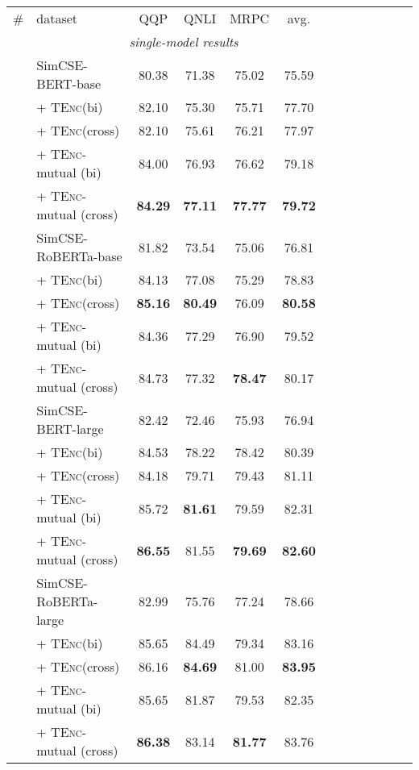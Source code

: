 \documentclass{article} \usepackage{iclr2021_conference,times}
\newcommand{\tenc}{\textsc{TEnc}\xspace}
\begin{document}
\begin{table}[!t] \setlength{\tabcolsep}{3.6pt}
\centering
\begin{tabular}{llccccccccccc}
\cmidrule[1.5pt]{1-10}
\# & dataset  & QQP & QNLI & MRPC & avg.\\
\cmidrule[1.5pt]{1-10}
\multicolumn{9}{c}{\textit{single-model results}} \\
\cmidrule[1.0pt]{1-10}
 & SimCSE-BERT-base & 80.38 & 71.38 & 75.02 & 75.59 \\
 & + \tenc (bi) & 82.10 & 75.30 & 75.71 & 77.70 \\
  & + \tenc (cross) & 82.10 & 75.61  & 76.21 & 77.97 \\
 \rowcolor{blue!5}
  & + \tenc-mutual (bi) &  84.00 & 76.93 & 76.62 & 79.18  \\
   \rowcolor{blue!5}
  & + \tenc-mutual (cross) & \textbf{84.29} & \textbf{77.11} & \textbf{77.77} & \textbf{79.72} \\
\hdashline
 & SimCSE-RoBERTa-base & 81.82 & 73.54 & 75.06 & 76.81  \\
 & + \tenc (bi) & 84.13 & 77.08 & 75.29 & 78.83  \\
  & + \tenc (cross) & \textbf{85.16} & \textbf{80.49} & 76.09 & \textbf{80.58}  \\
   \rowcolor{blue!5}
   & + \tenc-mutual (bi) & 84.36 & 77.29 & 76.90 & 79.52  \\
    \rowcolor{blue!5}
  & + \tenc-mutual (cross) & 84.73 & 77.32 & \textbf{78.47} & 80.17 \\
 \cmidrule[.5pt]{1-10}
 & SimCSE-BERT-large & 82.42 & 72.46 & 75.93 & 76.94 \\
  & + \tenc (bi) & 84.53 & 78.22 & 78.42 & 80.39 \\
  & + \tenc (cross) & 84.18 & 79.71 & 79.43 & 81.11 \\
  \rowcolor{red!5}
   & + \tenc-mutual (bi) & 85.72 & \textbf{81.61} & 79.59 & 82.31   \\
     \rowcolor{red!5} 
  & + \tenc-mutual (cross) & \textbf{86.55} & 81.55 & \textbf{79.69} & \textbf{82.60} \\
\hdashline
 & SimCSE-RoBERTa-large & 82.99 & 75.76 & 77.24 & 78.66 \\
   & + \tenc (bi) & 85.65 & 84.49 & 79.34 & 83.16 \\
  & + \tenc (cross) & 86.16 & \textbf{84.69} & 81.00 & \textbf{83.95} \\
    \rowcolor{red!5}
   & + \tenc-mutual (bi) &  85.65 & 81.87 & 79.53 & 82.35 \\
     \rowcolor{red!5}
  & + \tenc-mutual (cross) & \textbf{86.38} & 83.14 & \textbf{81.77} & 83.76 \\
  \cmidrule[1.5pt]{1-10}
  

\end{tabular}
\end{table}
\end{document}
